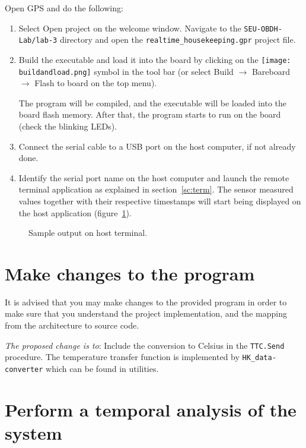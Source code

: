 Open GPS and do the following:
\begin{enumerate}
\item Select Open project on the welcome window. Navigate to the \textcolor{mPurple}{\texttt{SEU-OBDH-Lab/lab-3}} directory and open the \texttt{realtime\_housekeeping.gpr} project file.
\item Build the executable and load it into the board by clicking on the \hbox{\texttt{[image: buildandload.png]}} symbol in the tool bar (or select Build $\rightarrow$ Bareboard $\rightarrow$ Flash to board on the top menu).

The program will be compiled, and the executable will be loaded into the board flash memory. After that, the program starts to run on the board (check the blinking LEDs).
\item Connect the serial cable to a USB port on the host computer, if not already done.
\item Identify the serial port name on the host computer and launch the remote terminal application as explained in section~\ref{sc:term}. The sensor measured values together with their respective timestamps will start being displayed on the host application (figure~\ref{fig:output}).
\end{enumerate}

\begin{figure}[h]
            \caption{Sample output on host terminal.}
            \label{fig:output}
\end{figure}

\section{Make changes to the program}

It is advised that you may make changes
to the provided program in order to make sure
that you understand the project implementation,
and the mapping from the architecture to source code.

\textcolor{mRedBrown}{\textit{The proposed change is to}}: Include the conversion to Celsius in the \texttt{TTC.Send} procedure.
The temperature transfer function is implemented by \texttt{HK\_data-converter}
which can be found in utilities.

\section{Perform a temporal analysis of the system}\label{sc:ta}

